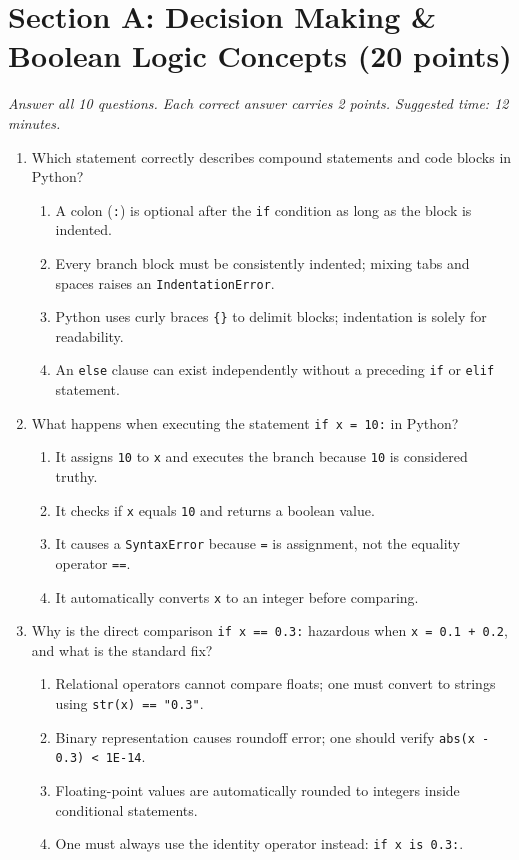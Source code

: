 \documentclass[11pt,a4paper]{article}
\begin{document}
\section*{Section A: Decision Making \& Boolean Logic Concepts \hfill \normalsize\normalfont(20 points)}
\textit{Answer all 10 questions. Each correct answer carries 2 points. Suggested time: 12 minutes.}

\begin{enumerate}[label=\textbf{Q\arabic*.},leftmargin=2em,itemsep=1.5pt,topsep=1pt]

\item Which statement correctly describes compound statements and code blocks in Python?
\begin{enumerate}[label=\Alph*.,leftmargin=2em]
  \item A colon (\texttt{:}) is optional after the \texttt{if} condition as long as the block is indented.
  \item Every branch block must be consistently indented; mixing tabs and spaces raises an \texttt{IndentationError}.
  \item Python uses curly braces \texttt{\{\}} to delimit blocks; indentation is solely for readability.
  \item An \texttt{else} clause can exist independently without a preceding \texttt{if} or \texttt{elif} statement.
\end{enumerate}

\item What happens when executing the statement \texttt{if x = 10:} in Python?
\begin{enumerate}[label=\Alph*.,leftmargin=2em]
  \item It assigns \texttt{10} to \texttt{x} and executes the branch because \texttt{10} is considered truthy.
  \item It checks if \texttt{x} equals \texttt{10} and returns a boolean value.
  \item It causes a \texttt{SyntaxError} because \texttt{=} is assignment, not the equality operator \texttt{==}.
  \item It automatically converts \texttt{x} to an integer before comparing.
\end{enumerate}

\item Why is the direct comparison \texttt{if x == 0.3:} hazardous when \texttt{x = 0.1 + 0.2}, and what is the standard fix?
\begin{enumerate}[label=\Alph*.,leftmargin=2em]
  \item Relational operators cannot compare floats; one must convert to strings using \texttt{str(x) == "0.3"}.
  \item Binary representation causes roundoff error; one should verify \texttt{abs(x - 0.3) < 1E-14}.
  \item Floating-point values are automatically rounded to integers inside conditional statements.
  \item One must always use the identity operator instead: \texttt{if x is 0.3:}.
\end{enumerate}


\end{enumerate}
\end{document}
